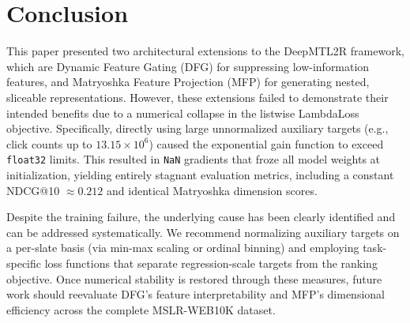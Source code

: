 \section{Conclusion}
This paper presented two architectural extensions to the DeepMTL2R framework, which are Dynamic Feature Gating (DFG) for suppressing low-information features, and Matryoshka Feature Projection (MFP) for generating nested, sliceable representations. However, these extensions failed to demonstrate their intended benefits due to a numerical collapse in the listwise LambdaLoss objective. Specifically, directly using large unnormalized auxiliary targets (e.g., click counts up to $13.15 \times 10^{6}$) caused the exponential gain function to exceed \texttt{float32} limits. This resulted in \texttt{NaN} gradients that froze all model weights at initialization, yielding entirely stagnant evaluation metrics, including a constant NDCG@10 $\approx 0.212$ and identical Matryoshka dimension scores.

Despite the training failure, the underlying cause has been clearly identified and can be addressed systematically. We recommend normalizing auxiliary targets on a per-slate basis (via min-max scaling or ordinal binning) and employing task-specific loss functions that separate regression-scale targets from the ranking objective. Once numerical stability is restored through these measures, future work should reevaluate DFG's feature interpretability and MFP's dimensional efficiency across the complete MSLR-WEB10K dataset.